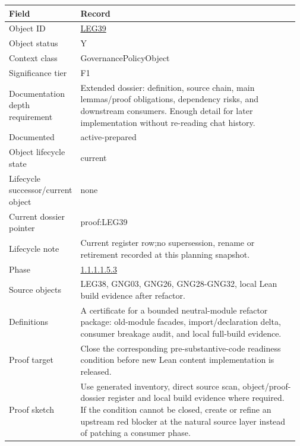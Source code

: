 \begin{longtable}{L{0.16\linewidth} L{0.81\linewidth}}
\hline
\textbf{Field} & \textbf{Record}\\
\hline
Object ID & \hyperlink{object-row-LEG39}{LEG39}\\
\hline\addlinespace[0.20em]
Object status & Y\\
\hline\addlinespace[0.20em]
Context class & GovernancePolicyObject\\
\hline\addlinespace[0.20em]
Significance tier & F1\\
\hline\addlinespace[0.20em]
Documentation depth requirement & Extended dossier: definition, source chain, main lemmas/\allowbreak{}proof obligations, dependency risks, and downstream consumers. Enough detail for later implementation without re-reading chat history.\\
\hline\addlinespace[0.20em]
Documented & active-prepared\\
\hline\addlinespace[0.20em]
Object lifecycle state & current\\
\hline\addlinespace[0.20em]
Lifecycle successor/\allowbreak{}current object & none\\
\hline\addlinespace[0.20em]
Current dossier pointer & proof:LEG39\\
\hline\addlinespace[0.20em]
Lifecycle note & Current register row;\newline no supersession, rename or retirement recorded at this planning snapshot.\\
\hline\addlinespace[0.20em]
Phase & \hyperlink{phase-row-1-1-1-1-5-3}{1.1.1.1.5.3}\\
\hline\addlinespace[0.20em]
Source objects & LEG38, GNG03, GNG26, GNG28-GNG32, local Lean build evidence after refactor.\\
\hline\addlinespace[0.20em]
Definitions & A certificate for a bounded neutral-module refactor package: old-module facades, import/\allowbreak{}declaration delta, consumer breakage audit, and local full-build evidence.\\
\hline\addlinespace[0.20em]
Proof target & Close the corresponding pre-substantive-code readiness condition before new Lean content implementation is released.\\
\hline\addlinespace[0.20em]
Proof sketch & Use generated inventory, direct source scan, object/\allowbreak{}proof-dossier register and local build evidence where required. If the condition cannot be closed, create or refine an upstream red blocker at the natural source layer instead of patching a consumer phase.\\

\end{longtable}
